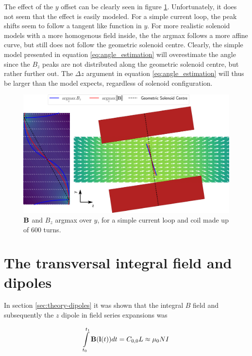 The effect of the $y$ offset can be clearly seen in figure
\ref{fig:sim-mag-fieldmap-argmax}. Unfortunately, it does not seem
that the effect is easily modeled. For a simple current loop, the peak
shifts seem to follow a tangent like function in $y$.
For more realistic solenoid models with a more homogenous
field inside, the the argmax follows a more affine curve,
but still does not follow the geometric solenoid centre.
Clearly, the simple model
presented in equation \ref{eq:angle_estimation} will overestimate
the angle since the $B_z$ peaks are not distributed along the geometric
solenoid centre, but rather further out. The $\Delta z$ argument in
equation \ref{eq:angle_estimation} will thus be larger than the model
expects, regardless of solenoid configuration.


\begin{figure}[h!]
    \centering
    \includegraphics[width=\linewidth]{figs/sim-fieldmap}
    \caption{$\vb{B}$ and $B_z$ argmax over $y$, for a simple current
        loop and coil made up of 600 turns.}
    \label{fig:sim-mag-fieldmap-argmax}
\end{figure}

\section{The transversal integral field and dipoles}
\label{sec:dipole-simulations}
In section \ref{sec:theory-dipoles} it was shown that the integral
$B$ field and subsequently the $z$ dipole in field
series expansions was


\begin{equation}
    \int \limits_{t_0}^{t_1} \vb{B}(\vb{l}(t))dt = C_{0,0}L \approx \mu_0 NI
    \label{eq:Bzlineint}
\end{equation}


